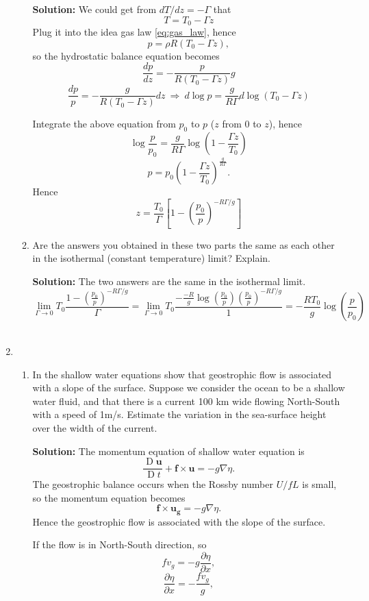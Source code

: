 \documentclass[a4paper]{article}
\begin{document}
\begin{enumerate}[label=\textbf{\arabic*.}]
\begin{enumerate}[label=(\alph*)]
			\textbf{Solution:} We could get from $dT /dz =-\Gamma$ that
			$$T=T_0-\Gamma z$$
			Plug it into the idea gas law \eqref{eq:gas_law}, hence
			$$p=\rho R (T_0-\Gamma z),$$
			so the hydrostatic balance equation becomes 
			$$\frac{d p}{d z}=-\frac{p}{R(T_0-\Gamma z)}g$$
			$$\frac{d p}{p}=-\frac{g}{R(T_0-\Gamma z)}dz~\Longrightarrow~d \operatorname{log}p=\frac{g}{R\Gamma}d\operatorname{log}(T_0-\Gamma z)$$
			
			Integrate the above equation from $p_0$ to $p$ ($z$ from $0$ to $z$), hence
			$$\operatorname{log}\frac{p}{p_0}=\frac{g}{R\Gamma}\operatorname{log}\left(1-\frac{\Gamma z}{T_0}\right)$$
			$$p=p_0\left(1-\frac{\Gamma z}{T_0}\right)^{\frac{g}{R\Gamma}}.$$
			Hence $$z=\frac{T_0}{\Gamma}\left[1-\left(\frac{p_0}{p}\right)^{-R\Gamma/g}\right]$$
			\item Are the answers you obtained in these two parts the same as each other in the isothermal (constant temperature) limit? Explain.
			
			\textbf{Solution:} The two answers are the same in the isothermal limit.
			$$\lim\limits_{\Gamma \longrightarrow 0} T_0\frac{1-\left(\frac{p_0}{p}\right)^{-R\Gamma/g}}{\Gamma} = \lim\limits_{\Gamma \longrightarrow 0}T_0 \frac{-\frac{-R}{g}\operatorname{log}\left(\frac{p_0}{p}\right)\left(\frac{p_0}{p}\right)^{-R\Gamma/g}}{1} = -\frac{RT_0}{g}\operatorname{log}\left(\frac{p}{p_0}\right)$$\\
		\end{enumerate}

	\setcounter{enumi}{3}
	\item \begin{enumerate}[label=(\alph*)] 
		\item In the shallow water equations show that geostrophic flow is associated with a slope of the surface. Suppose we consider the ocean to be a shallow water fluid, and that there is a current 100 km wide flowing North-South with a speed of 1m/s. Estimate the variation in the sea-surface height over the width of the current.
		
		\textbf{Solution:} The momentum equation of shallow water equation is 
		$$\frac{\operatorname{D}\bm{u}}{\operatorname{D}t}+\bm{f}\times \bm{u}=-g\nabla \eta .$$
		The geostrophic balance occurs when the Rossby number $U/fL$ is small, so the momentum equation becomes
		$$\bm{f}\times \bm{u_g}=-g\nabla \eta.$$
		Hence the geostrophic flow is associated with the slope of the surface.
		
		If the flow is in North-South direction, so 
		$$fv_g = -g\frac{\partial \eta}{\partial x},$$
		$$\frac{\partial \eta}{\partial x} = -\frac{fv_g}{g},$$
		

\end{enumerate}
\end{enumerate}
\end{document}
